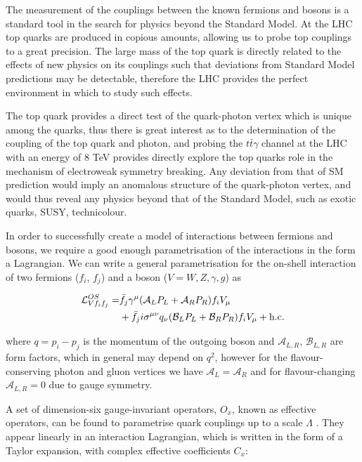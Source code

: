 The measurement of the couplings between the known fermions and bosons is a standard tool in the search for physics beyond the Standard Model. At the LHC top quarks are produced in copious amounts, allowing us to probe top couplings to a great precision. The large mass of the top quark is directly related to the effects of new physics on its couplings such that deviations from Standard Model predictions may be detectable, therefore the LHC provides the perfect environment in which to study such effects.

The top quark provides a direct test of the quark-photon vertex which is unique among the quarks, thus there is great interest as to the determination of the coupling of the top quark and photon, and probing the $t\bar{t}\gamma$ channel at the LHC with an energy of 8 TeV provides directly explore the top quarks role in the mechanism of electroweak symmetry breaking. Any deviation from that of SM prediction would imply an anomalous structure of the quark-photon vertex, and would thus reveal any physics beyond that of the Standard Model, such as exotic quarks, SUSY, technicolour. 

In order to successfully create a model of interactions between fermions and bosons, we require a good enough parametrisation of the interactions in the form a Lagrangian. We can write a general parametrisation for the on-shell interaction of two fermions ($f_i$, $f_j$) and a boson ($V = W,Z,\gamma,g$) as

\begin{equation}
\begin{split}
\mathcal{L}^{OS}_{Vf_if_j} = & \bar{f}_j\gamma^{\mu} (\mathcal{A}_L P_L + \mathcal{A}_R P_R)f_i V_{\mu} \\
& + \bar{f}_j i \sigma^{\mu \nu} q_{\nu}(\mathcal{B}_L P_L + \mathcal{B}_R P_R) f_i V_{\mu} + \text{h.c.}
\end{split}
\end{equation}

where $q = p_i - p_j$ is the momentum of the outgoing boson and $\mathcal{A}_{L,R}$, $\mathcal{B}_{L,R}$ are form factors, which in general may depend on $q^2$, however for the flavour-conserving photon and gluon vertices we have $\mathcal{A}_L = \mathcal{A}_R$ and for flavour-changing $\mathcal{A}_{L,R} = 0$ due to gauge symmetry. 

A set of dimension-six gauge-invariant operators, $O_x$, known as effective operators, can be found to parametrise quark couplings up to a scale $\Lambda$ \cite{anom-coups}. They appear linearly in an interaction Lagrangian, which is written in the form of a Taylor expansion, with complex effective coefficients $C_x$:

